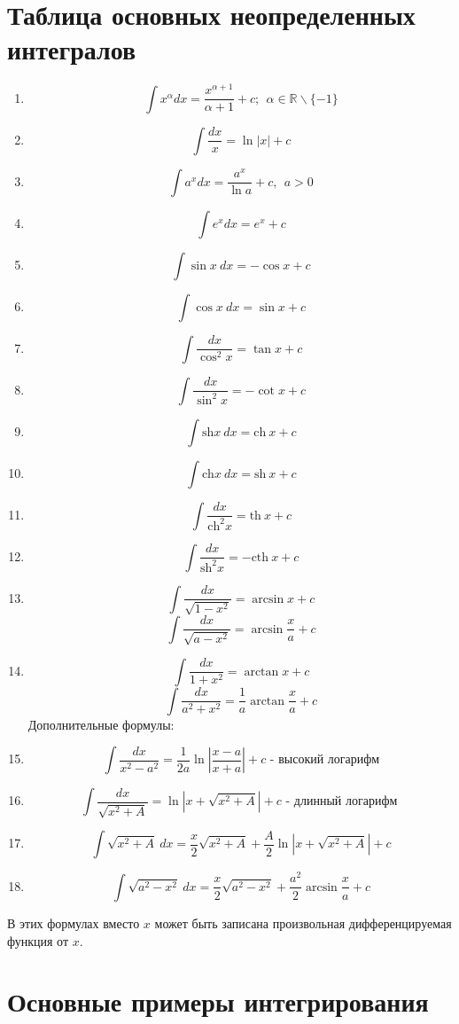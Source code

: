 \documentclass[a4paper,12pt]{bookest}
\theoremstyle{remark}
\begin{document}
\section{Таблица основных неопределенных интегралов}
\begin{enumerate}
	\item $$\int x^\alpha dx=\frac{x^{\alpha+1}}{\alpha+1}+c;\>\>\alpha\in\mathbb{R}\backslash\{-1\}$$
	\item $$\int\frac{dx}{x}=\ln|x|+c$$
	\item $$\int a^xdx=\frac{a^x}{\ln a}+c,\>\>a>0$$
	\item $$\int e^xdx=e^x+c$$
	\item $$\int\sin x\>dx	=-\cos x+c$$
	\item $$\int\cos x\>dx=\sin x+c$$
	\item $$\int\frac{dx}{\cos^2x}=\tan x+c$$
	\item $$\int\frac{dx}{\sin^2x}=-\cot x+c$$
	\item $$\int\textrm{sh}x\>dx=\textrm{ch}\>x+c$$
	\item $$\int\textrm{ch}x\>dx=\textrm{sh}\>x+c$$
	\item $$\int\frac{dx}{\textrm{ch}^2x}=\textrm{th}\>x+c$$
	\item $$\int\frac{dx}{\textrm{sh}^2x}=-\textrm{cth}\>x+c$$
	\item $$\int\frac{dx}{\sqrt{1-x^2}}=\arcsin x+c$$
		$$\int\frac{dx}{\sqrt{a-x^2}}=\arcsin \frac{x}{a}+c$$
	\item $$\int\frac{dx}{1+x^2}=\arctan x+c$$
		$$\int\frac{dx}{a^2+x^2}=\frac{1}{a}\arctan\frac{x}{a}+c$$
		Дополнительные формулы: 
	\item $$\int\frac{dx}{x^2-a^2}=\frac{1}{2a}\ln|\frac{x-a}{x+a}|+c\textrm{ - высокий логарифм}$$ 
	\item $$\int\frac{dx}{\sqrt{x^2+A}}=\ln|x+\sqrt{x^2+A}|+c\textrm{ - длинный логарифм }$$
	\item $$\int\sqrt{x^2+A}\>dx=\frac{x}{2}\sqrt{x^2+A}+\frac{A}{2}\ln|x+\sqrt{x^2+A}|+c$$
	\item $$\int\sqrt{a^2-x^2}\>dx=\frac{x}{2}\sqrt{a^2-x^2}+\frac{a^2}{2}\arcsin\frac{x}{a}+c$$
\end{enumerate}
В этих формулах вместо $x$ может быть записана произвольная дифференцируемая функция от $x$.
\section{Основные примеры интегрирования}
\end{document}
